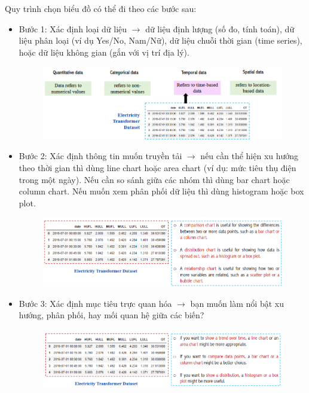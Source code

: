 \documentclass[11pt]{article}
\begin{document}
Quy trình chọn biểu đồ có thể đi theo các bước sau:
\begin{itemize}
    \item Bước 1: Xác định loại dữ liệu $\rightarrow$ dữ liệu định lượng (số đo, tính toán), dữ liệu phân loại (ví dụ Yes/No, Nam/Nữ), dữ liệu chuỗi thời gian (time series), hoặc dữ liệu không gian (gắn với vị trí địa lý).
    \begin{figure}[H]
        \centering
        \includegraphics[width=1\linewidth]{images/rc1.png}
        \label{fig:rc1}
    \end{figure}

    \item Bước 2: Xác định thông tin muốn truyền tải $\rightarrow$ nếu cần thể hiện xu hướng theo thời gian thì dùng line chart hoặc area chart (ví dụ: mức tiêu thụ điện trong một ngày). Nếu cần so sánh giữa các nhóm thì dùng bar chart hoặc column chart. Nếu muốn xem phân phối dữ liệu thì dùng histogram hoặc box plot.
    \begin{figure}[H]
        \centering
        \includegraphics[width=1\linewidth]{images/rc2.png}
        \label{fig:rc2}
    \end{figure}

    \item Bước 3: Xác định mục tiêu trực quan hóa $\rightarrow$ bạn muốn làm nổi bật xu hướng, phân phối, hay mối quan hệ giữa các biến?
    \begin{figure}[H]
        \centering
        \includegraphics[width=1\linewidth]{images/rc3.png}
        \label{fig:rc3}
    \end{figure}


\end{itemize}
\end{document}
